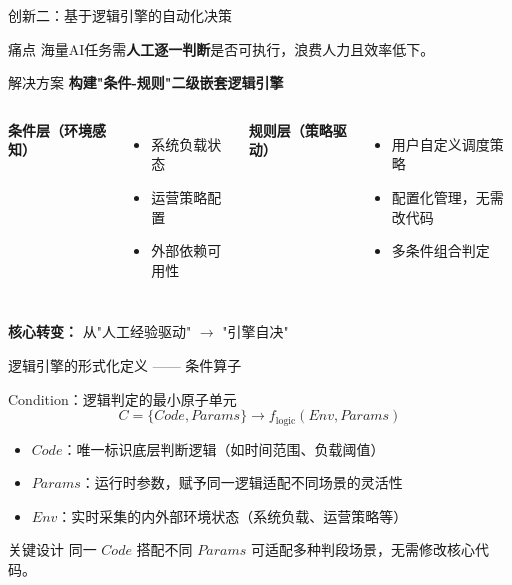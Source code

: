\documentclass[aspectratio=169,UTF8,xcolor=table]{ctexbeamer}
\begin{document}
\begin{frame}{创新二：基于逻辑引擎的自动化决策}
  \begin{alertblock}{痛点}
    海量AI任务需\textbf{人工逐一判断}是否可执行，浪费人力且效率低下。
  \end{alertblock}

  \begin{exampleblock}{解决方案}
    \textbf{构建"条件-规则"二级嵌套逻辑引擎}
    \begin{columns}[T]
      \textbf{条件层（环境感知）}
      \begin{itemize}
        \item 系统负载状态
        \item 运营策略配置
        \item 外部依赖可用性
      \end{itemize}

      \textbf{规则层（策略驱动）}
      \begin{itemize}
        \item 用户自定义调度策略
        \item 配置化管理，无需改代码
        \item 多条件组合判定
      \end{itemize}
    \end{columns}
  \end{exampleblock}

  \begin{center}
    \textbf{核心转变：} 从"人工经验驱动" $\longrightarrow$ "引擎自决"
  \end{center}
\end{frame}

\begin{frame}{逻辑引擎的形式化定义 —— 条件算子}
  \begin{block}{Condition：逻辑判定的最小原子单元}
    \[
    C = \{Code, Params\} \rightarrow f_{\mathrm{logic}}(Env, Params)
    \]
  \end{block}

  \vspace{0.3cm}
  \begin{itemize}
    \item \textbf{$Code$}：唯一标识底层判断逻辑（如时间范围、负载阈值）
    \item \textbf{$Params$}：运行时参数，赋予同一逻辑适配不同场景的灵活性
    \item \textbf{$Env$}：实时采集的内外部环境状态（系统负载、运营策略等）
  \end{itemize}

  \vspace{0.5cm}
  \begin{exampleblock}{关键设计}
    同一 $Code$ 搭配不同 $Params$ 可适配多种判段场景，无需修改核心代码。
  \end{exampleblock}
\end{frame}
\end{document}
